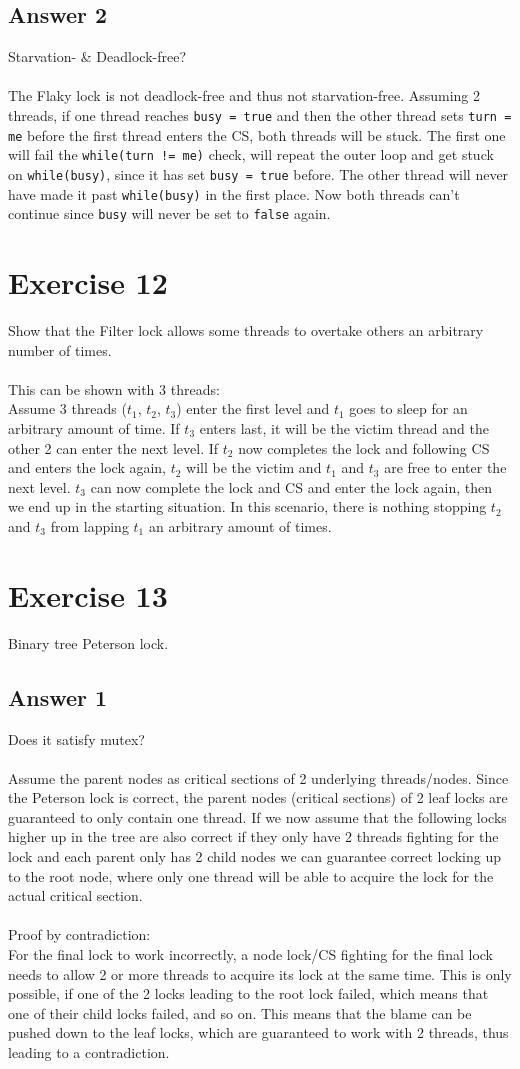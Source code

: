 \documentclass[a4paper,%
11pt,%
DIV=14,
headsepline,%
headings=normal,
]{scrartcl}
\newcommand{\exercise}[1]{\section*{Exercise #1}}
\newcommand{\answer}[1]{\subsection*{Answer #1}}
\begin{document}
\answer{2}

Starvation- \& Deadlock-free?\\
\\
The Flaky lock is not deadlock-free and thus not starvation-free. Assuming 2 threads, if one thread reaches \texttt{busy = true} and then the other thread sets \texttt{turn = me} before the first thread enters the CS, both threads will be stuck. The first one will fail the \texttt{while(turn != me)} check, will repeat the outer loop and get stuck on \texttt{while(busy)}, since it has set \texttt{busy = true} before. The other thread will never have made it past \texttt{while(busy)} in the first place. Now both threads can't continue since \texttt{busy} will never be set to \texttt{false} again.

\exercise{12}

Show that the Filter lock allows some threads to overtake others an arbitrary number of times.\\
\\
This can be shown with 3 threads:\\
Assume 3 threads ($t_1$, $t_2$, $t_3$) enter the first level and $t_1$ goes to sleep for an arbitrary amount of time. If $t_3$ enters last, it will be the victim thread and the other 2 can enter the next level. If $t_2$ now completes the lock and following CS and enters the lock again, $t_2$ will be the victim and $t_1$ and $t_3$ are free to enter the next level. $t_3$ can now complete the lock and CS and enter the lock again, then we end up in the starting situation. In this scenario, there is nothing stopping $t_2$ and $t_3$ from lapping $t_1$ an arbitrary amount of times.

\exercise{13}

Binary tree Peterson lock.

\answer{1}

Does it satisfy mutex?\\
\\
Assume the parent nodes as critical sections of 2 underlying threads/nodes. Since the Peterson lock is correct, the parent nodes (critical sections) of 2 leaf locks are guaranteed to only contain one thread. If we now assume that the following locks higher up in the tree are also correct if they only have 2 threads fighting for the lock and each parent only has 2 child nodes we can guarantee correct locking up to the root node, where only one thread will be able to acquire the lock for the actual critical section.\\
\\
Proof by contradiction:\\
For the final lock to work incorrectly, a node lock/CS fighting for the final lock needs to allow 2 or more threads to acquire its lock at the same time. This is only possible, if one of the 2 locks leading to the root lock failed, which means that one of their child locks failed, and so on. This means that the blame can be pushed down to the leaf locks, which are guaranteed to work with 2 threads, thus leading to a contradiction.
\end{document}
